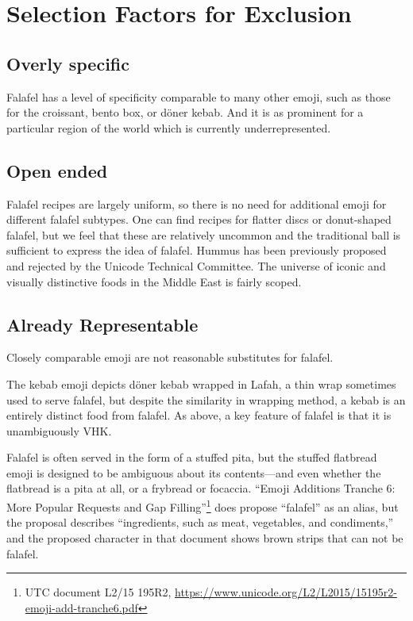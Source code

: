\documentclass[a4paper,10pt]{article}
\begin{document}
\section{Selection Factors for Exclusion}

\subsection{Overly specific}

{\sc Falafel} has a level of specificity comparable to many other emoji, such as those
for the croissant, bento box, or döner kebab. And it is as prominent for a particular
region of the world which is currently underrepresented.

\subsection{Open ended}

Falafel recipes are largely uniform, so there is no need for additional emoji for
different falafel subtypes. One can find recipes for flatter discs or donut-shaped
falafel, but we feel that these are relatively uncommon and the traditional ball is
sufficient to express the idea of falafel.
{\sc Hummus} has been previously proposed and rejected
by the Unicode Technical Committee. The universe of iconic and visually distinctive
foods in the Middle East is fairly scoped.

\subsection{Already Representable}

Closely comparable emoji are not reasonable substitutes for falafel.

The {\sc kebab} emoji depicts döner kebab wrapped in Lafah, a thin wrap sometimes used to serve
falafel, but despite the similarity in wrapping method, a kebab is an entirely distinct food from falafel.
As above, a key feature of falafel is that it is unambiguously VHK.

Falafel is often served in the form of a stuffed pita, but the {\sc stuffed flatbread}
emoji is designed to be ambiguous about its contents---and even whether the flatbread is a
pita at all, or a frybread or focaccia. ``Emoji Additions Tranche 6: More
Popular Requests and Gap Filling''\footnote{UTC document L2/15 195R2, \url{https://www.unicode.org/L2/L2015/15195r2-emoji-add-tranche6.pdf}} does propose ``falafel'' as an alias,
but the proposal describes ``ingredients, such as meat, vegetables, and condiments,''
and the proposed character in that document shows brown strips that can not be falafel.
\end{document}
